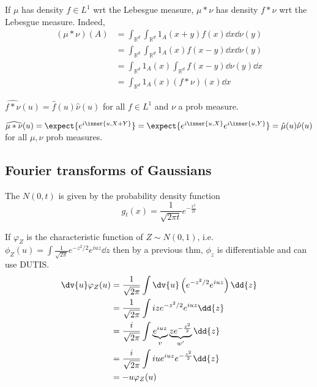 If $\mu$ has density $f \in L^1$ wrt the Lebesgue measure, $\mu \ast \nu$ has density $f \ast \nu$ wrt the Lebesgue measure.
Indeed,
\begin{align*}
	(\mu \ast \nu)(A) &= \int_{\mathbb R^d} \int_{\mathbb R^d} 1_A(x+y) f(x) \dd{x} \dd{\nu(y)} \\
	&= \int_{\mathbb R^d} \int_{\mathbb R^d} 1_A(x) f(x-y) \dd{x} \dd{\nu(y)} \\
	&= \int_{\mathbb R^d} 1_A(x) \int_{\mathbb R^d}f(x-y) \dd{\nu(y)} \dd{x} \\
	&= \int_{\mathbb R^d} 1_A(x) (f \ast \nu)(x) \dd{x}
\end{align*}

\begin{proposition}
	$\widehat{f \ast \nu}(u) = \hat f(u) \hat \nu(u)$ for all $f \in L^1$ and $\nu$ a prob measure.
\end{proposition}

\begin{proposition}
	$\widehat{\mu \ast \nu}(u) = \expect{e^{i\inner{u,X+Y}}} = \expect{e^{i\inner{u,X}}e^{i\inner{u,Y}}} = \hat \mu(u) \hat \nu(u)$ for all $\mu, \nu$ prob measures.
\end{proposition}

\subsection{Fourier transforms of Gaussians}

\begin{definition}
	The  $N(0,t)$ is given by the probability density function
	\[ g_t(x) = \frac{1}{\sqrt{2\pi t}} e^{-\frac{x^2}{2t}} \]
\end{definition}

If $\varphi_Z$ is the characteristic function of $Z \sim N(0, 1)$, i.e. $\phi_Z(u) = \int \frac{1}{\sqrt{2 \pi}} e^{-z^2 / 2} e^{iuz} \dd{z}$ then by a previous thm, $\phi_z$ is differentiable and can use DUTIS.
\begin{align*}
	\dv{u} \varphi_Z(u) &= \frac{1}{\sqrt{2 \pi}} \int \dv{u} \left(e^{-z^2 / 2} e^{iuz}\right) \dd{z} \\
	&= \frac{1}{\sqrt{2 \pi}} \int iz e^{-z^2 / 2} e^{iuz} \dd{z} \\
	&= \frac{i}{\sqrt{2\pi}} \int \underbrace{e^{iuz}}_{v} \underbrace{z e^{-\frac{z^2}{2}}}_{w'} \dd{z} \\
	&= \frac{i}{\sqrt{2\pi}} \int iu e^{iuz} e^{-\frac{z^2}{2}} \dd{z} \\
	&= -u \varphi_Z(u)
\end{align*}

